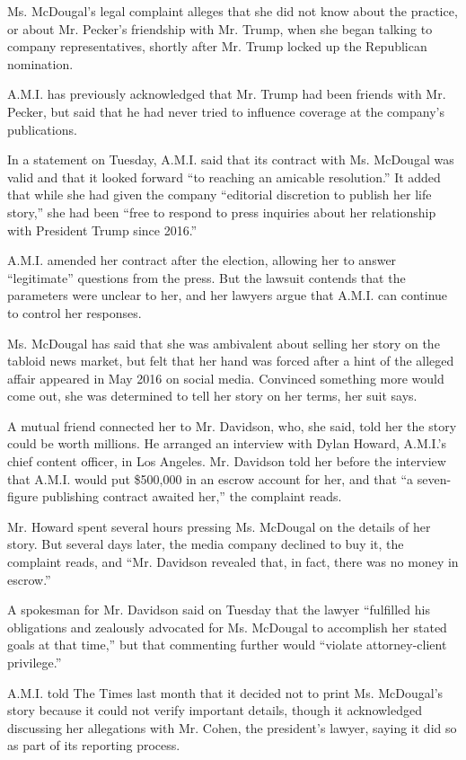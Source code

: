 Ms. McDougal's legal complaint alleges that she did not know about the
practice, or about Mr. Pecker's friendship with Mr. Trump, when she
began talking to company representatives, shortly after Mr. Trump locked
up the Republican nomination.

A.M.I. has previously acknowledged that Mr. Trump had been friends with
Mr. Pecker, but said that he had never tried to influence coverage at
the company's publications.

In a statement on Tuesday, A.M.I. said that its contract with Ms.
McDougal was valid and that it looked forward ``to reaching an amicable
resolution.'' It added that while she had given the company ``editorial
discretion to publish her life story,'' she had been ``free to respond
to press inquiries about her relationship with President Trump since
2016.''

A.M.I. amended her contract after the election, allowing her to answer
``legitimate'' questions from the press. But the lawsuit contends that
the parameters were unclear to her, and her lawyers argue that A.M.I.
can continue to control her responses.

Ms. McDougal has said that she was ambivalent about selling her story on
the tabloid news market, but felt that her hand was forced after a hint
of the alleged affair appeared in May 2016 on social media. Convinced
something more would come out, she was determined to tell her story on
her terms, her suit says.

A mutual friend connected her to Mr. Davidson, who, she said, told her
the story could be worth millions. He arranged an interview with Dylan
Howard, A.M.I.'s chief content officer, in Los Angeles. Mr. Davidson
told her before the interview that A.M.I. would put \$500,000 in an
escrow account for her, and that ``a seven-figure publishing contract
awaited her,'' the complaint reads.

Mr. Howard spent several hours pressing Ms. McDougal on the details of
her story. But several days later, the media company declined to buy it,
the complaint reads, and ``Mr. Davidson revealed that, in fact, there
was no money in escrow.''

A spokesman for Mr. Davidson said on Tuesday that the lawyer ``fulfilled
his obligations and zealously advocated for Ms. McDougal to accomplish
her stated goals at that time,'' but that commenting further would
``violate attorney-client privilege.''

A.M.I. told The Times last month that it decided not to print Ms.
McDougal's story because it could not verify important details, though
it acknowledged discussing her allegations with Mr. Cohen, the
president's lawyer, saying it did so as part of its reporting process.

